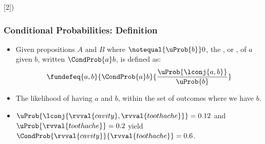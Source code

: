 \documentclass[notes,mh]{mikoslides}
\begin{document}
\begin{module}[id=condprob]
[2]{)}

\begin{frame}
  \frametitle{Conditional Probabilities: Definition}
  \begin{itemize}
  \item 
    \begin{definition}
      Given propositions $A$ and $B$ where $\notequal{\uProb{b}}0$, the
      , or
      , of $a$ given $b$, written
      $\CondProb{a}b$, is defined as:
      \[\fundefeq{a,b}{\CondProb{a}b}{\frac{\uProb{\lconj{a,b}}}{\uProb{b}}}\]
    \end{definition} 
  \item 
    \begin{omtext}[title=Intuition]
      The likelihood of having $a$ and $b$, within the set of outcomes where we have $b$.
    \end{omtext}
  \item 
    \begin{example}
      $\uProb{\lconj{\rvval{cavity},\rvval{toothache}}} = 0.12$ and
      $\uProb{\rvval{toothache}} = 0.2$ yield
      $\CondProb{\rvval{cavity} }{\rvval{toothache}} = 0.6$.
    \end{example}
  \end{itemize}
\end{frame}
\end{module}
\end{document}

